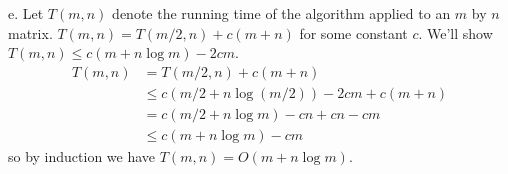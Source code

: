 \documentclass{article}
\begin{document}
e. Let $T(m,n)$ denote the running time of the algorithm applied to an $m$ by $n$ matrix.  $T(m,n) = T(m/2,n) + c(m+n)$ for some constant $c$.  We'll show $T(m,n) \leq c(m + n\log m) - 2cm$.
\begin{align*}
T(m,n) &= T(m/2,n) + c(m+n)\\
&\leq c(m/2 + n\log(m/2)) - 2cm + c(m+n) \\
&= c(m/2 + n\log m) - cn + cn - cm \\
& \leq c(m+n\log m) - cm
\end{align*}
so by induction we have $T(m,n) = O(m+n\log m)$.
\end{document}
